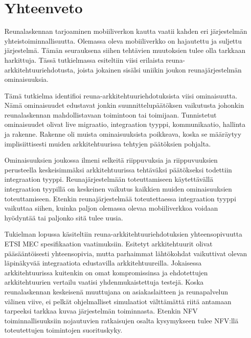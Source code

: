 \section{Yhteenveto} \label{yhteenveto}
Reunalaskennan tarjoaminen mobiiliverkon kautta vaatii kahden eri järjestelmän yhteistoiminnallisuutta.
Olemassa oleva mobiiliverkko on hajautettu ja suljettu järjestelmä.
Tämän seurauksena siihen tehtävien muutoksien tulee olla tarkkaan harkittuja.
Tässä tutkielmassa esiteltiin viisi erilaista reuna-arkkitehtuuriehdotusta, joista jokainen sisälsi uniikin joukon reunajärjestelmän ominaisuuksia.

Tämä tutkielma identifioi reuna-arkkitehtuuriehdotuksista viisi ominaisuutta.
Nämä ominaisuudet edustavat jonkin suunnittelupäätöksen vaikutusta johonkin reunalaskennan mahdollistavaan toimintoon tai toimijaan.
Tunnistetut ominaisuudet olivat live migraatio, integraation tyyppi, kommunikaatio, hallinta ja rakenne.
Rakenne oli muista ominaisuuksista poikkeava, koska se määräytyy implisiittisesti muiden arkkitehtuurissa tehtyjen päätöksien pohjalta.

Ominaisuuksien joukossa ilmeni selkeitä riippuvuksia ja riippuvuuksien perusteella keskeisimmäksi arkkitehtuurissa tehtäväksi päätökseksi todettiin integraation tyyppi.
Reunajärjestelmään toteuttamiseen käytettävällä integraation tyypillä on keskeinen vaikutus kaikkien muiden ominaisuuksien toteuttamiseen.
Etenkin reunajärjestelmää toteutettaessa integraation tyyppi vaikuttaa siihen, kuinka paljon olemassa olevaa mobiiliverkkoa voidaan hyödyntää tai paljonko sitä tulee uusia. 

Tukielman lopussa käsiteltiin reuna-arkkitehtuuriehdotuksien yhteensopivuutta ETSI MEC spesifikaation vaatimuksiin.
Esitetyt arkkitehtuurit olivat pääsääntöisesti yhteensopivia, mutta parhaimmat lähtökohdat vaikuttivat olevan läpinäkyvää integraatiota edustavilla arkkitehtuureilla.
Jokaisessa arkkitehtuurissa kuitenkin on omat kompromissinsa ja ehdotettujen arkkitehtuurien vertailu vaatisi yhdenmukaistettuja testejä. 
Koska reunalaskennan keskeisenä muuttujana on asiakaslaitteen ja reunapalvelun välinen viive, ei pelkät ohjelmalliset simulaatiot välttämättä riitä antamaan tarpeeksi tarkkaa kuvaa järjestelmän toiminnasta.
Etenkin NFV toiminnallisuuksiin nojautuvien ratkaisujen osalta kysymykseen tulee NFV:llä toteutettujen toimintojen suorituskyky.

%



